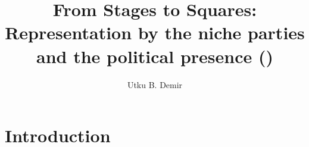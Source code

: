 
\title{From Stages to Squares: Representation by the niche parties and the
political presence ()}
\author{Utku B. Demir}


\maketitle

\chapter{Introduction}\label{chap:Introduction} %

